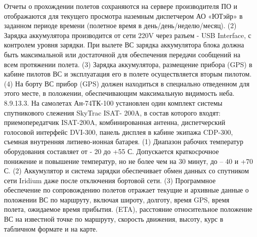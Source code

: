 Отчеты о прохождении полетов сохраняются на сервере производителя ПО и отображаются для текущего
просмотра наземным диспетчером АО «ЮТэйр» в заданном периоде времени (полетное время в день/день/неделю/месяц).
(2) Зарядка аккумулятора производится от сети 220V через разъем - USB Interface, с контролем уровня
зарядки. При вылете ВС зарядка аккумулятора блока должна быть максимальной или достаточной для обеспечения передачи сообщений на всем протяжении полета.
(3) Зарядка аккумулятора, размещение прибора (GPS) в кабине пилотов ВС и эксплуатация его в полете
осуществляется вторым пилотом.
(4) На борту ВС прибор (GPS) должен находиться в специально отведенном для этого месте, в положении, обеспечивающим максимальную видимость неба.
8.9.13.3. На самолетах Ан-74ТК-100 установлен один комплект системы спутникового слежения SkyTrac ISAT- 200A, в состав которого входят: приемопередатчик ISAT-200A, комбинированная антенна, диспетчерский голосовой интерфейс DVI-300, панель дисплея в кабине экипажа CDP-300, съемная внутренняя литиево-ионная батарея.
(1) Диапазон рабочих температур оборудования составляет от - 20 до +55 С. Допускается краткосрочное
понижение и повышение температур, но не более чем на 30 минут, до – 40 и +70 С.
(2) Аккумулятор и система зарядки обеспечивает обмен данных со спутником сети Iridium даже после
отключения бортовой сети.
(3) Программное обеспечение по сопровождению полетов отражает текущие и архивные данные о
положении ВС по маршруту, включая широту, долготу, время GPS, время полета, ожидаемое время прибытия.
(ETA), расстояние относительное положение ВС на известной точке по маршруту, скорость движения, высоту, курс в табличном формате и на карте. 
 
